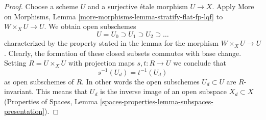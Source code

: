 \documentclass{stacks-project}
\theoremstyle{plain}
\theoremstyle{definition}
\theoremstyle{remark}
\numberwithin{equation}{subsection}
\begin{document}
\begin{proof}
Choose a scheme $U$ and a surjective \'etale morphism $U \to X$. Apply
More on Morphisms, Lemma \ref{more-morphisms-lemma-stratify-flat-fp-lqf}
to $W \times_X U \to U$. We obtain open subschemes
$$
U = U_0 \supset U_1 \supset U_2 \supset \ldots
$$
characterized by the property stated in the lemma for the morphism
$W \times_X U \to U$. Clearly, the formation of these closed subsets commutes
with base change. Setting $R = U \times_X U$ with projection maps
$s, t : R \to U$ we conclude that
$$
s^{-1}(U_d) = t^{-1}(U_d)
$$
as open subschemes of $R$. In other words the open subschemes $U_d \subset U$
are $R$-invariant. This means that $U_d$ is the inverse image of an
open subspace $X_d \subset X$
(Properties of Spaces, Lemma
\ref{spaces-properties-lemma-subspaces-presentation}).
\end{proof}
\end{document}
